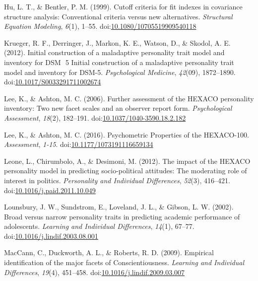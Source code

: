 \documentclass[,man,floatsintext]{apa6}
\theoremstyle{definition}
\theoremstyle{definition}
\theoremstyle{definition}
\theoremstyle{remark}
\begin{document}
\leavevmode\hypertarget{ref-Hu1999}{}%
Hu, L. T., \& Bentler, P. M. (1999). Cutoff criteria for fit indexes in
covariance structure analysis: Conventional criteria versus new
alternatives. \emph{Structural Equation Modeling}, \emph{6}(1), 1--55.
doi:\href{https://doi.org/10.1080/10705519909540118}{10.1080/10705519909540118}

\leavevmode\hypertarget{ref-Krueger2012a}{}%
Krueger, R. F., Derringer, J., Markon, K. E., Watson, D., \& Skodol, A.
E. (2012). Initial construction of a maladaptive personality trait model
and inventory for DSM ­ 5 Initial construction of a maladaptive
personality trait model and inventory for DSM-5. \emph{Psychological
Medicine}, \emph{42}(09), 1872--1890.
doi:\href{https://doi.org/10.1017/S0033291711002674}{10.1017/S0033291711002674}

\leavevmode\hypertarget{ref-Lee2006}{}%
Lee, K., \& Ashton, M. C. (2006). Further assessment of the HEXACO
personality inventory: Two new facet scales and an observer report form.
\emph{Psychological Assessment}, \emph{18}(2), 182--191.
doi:\href{https://doi.org/10.1037/1040-3590.18.2.182}{10.1037/1040-3590.18.2.182}

\leavevmode\hypertarget{ref-Lee2016}{}%
Lee, K., \& Ashton, M. C. (2016). Psychometric Properties of the
HEXACO-100. \emph{Assessment}, \emph{1-15}.
doi:\href{https://doi.org/10.1177/1073191116659134}{10.1177/1073191116659134}

\leavevmode\hypertarget{ref-Leone2012}{}%
Leone, L., Chirumbolo, A., \& Desimoni, M. (2012). The impact of the
HEXACO personality model in predicting socio-political attitudes: The
moderating role of interest in politics. \emph{Personality and
Individual Differences}, \emph{52}(3), 416--421.
doi:\href{https://doi.org/10.1016/j.paid.2011.10.049}{10.1016/j.paid.2011.10.049}

\leavevmode\hypertarget{ref-Lounsbury2002}{}%
Lounsbury, J. W., Sundstrom, E., Loveland, J. L., \& Gibson, L. W.
(2002). Broad versus narrow personality traits in predicting academic
performance of adolescents. \emph{Learning and Individual Differences},
\emph{14}(1), 67--77.
doi:\href{https://doi.org/10.1016/j.lindif.2003.08.001}{10.1016/j.lindif.2003.08.001}

\leavevmode\hypertarget{ref-MacCann2009}{}%
MacCann, C., Duckworth, A. L., \& Roberts, R. D. (2009). Empirical
identification of the major facets of Conscientiousness. \emph{Learning
and Individual Differences}, \emph{19}(4), 451--458.
doi:\href{https://doi.org/10.1016/j.lindif.2009.03.007}{10.1016/j.lindif.2009.03.007}
\end{document}

